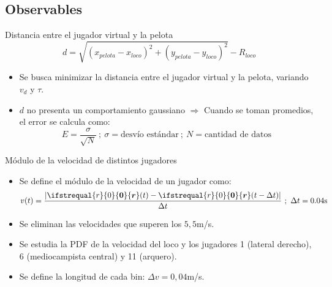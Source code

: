 \documentclass{beamer}
\renewcommand\vec[1]{\ifstrequal{#1}{0}{\ensuremath{\mathbf{0}}}{\ensuremath{\boldsymbol{#1}}}}
\begin{document}
        \subsection{Observables}

            \begin{frame}{Distancia entre el jugador virtual y la pelota}
                \begin{equation*}
                    d = \sqrt{(x_{pelota} - x_{loco})^2 + (y_{pelota} - y_{loco})^2} - R_{loco}
                \end{equation*}
                \begin{itemize}
                    \item Se busca minimizar la distancia entre el jugador virtual y la pelota, variando $v_d$ y $\tau$.
                    \item $d$ no presenta un comportamiento gaussiano $\Rightarrow$ Cuando se toman promedios, el error se calcula como:
                    \begin{equation*}
                        E = \frac{\sigma}{\sqrt{N}}\ ;\ \sigma = \text{desvío estándar}\ ;\ N = \text{cantidad de datos}
                    \end{equation*}
                \end{itemize}
            \end{frame}

            \begin{frame}{Módulo de la velocidad de distintos jugadores}
                \begin{itemize}
                    \item Se define el módulo de la velocidad de un jugador como:
                    \begin{equation*}
                        v(t) = \frac{|\vec{r}(t) - \vec{r}(t - \Delta t)|}{\Delta t}\ ;\ \Delta t = 0.04 \text{s}
                    \end{equation*}
                    \item Se eliminan las velocidades que superen los $5,5$m/s.
                    \item Se estudia la PDF de la velocidad del loco y los jugadores 1 (lateral derecho), 6 (mediocampista central) y 11 (arquero).
                    \item Se define la longitud de cada bin: $\Delta v = 0,04$m/s.
                \end{itemize}
            \end{frame}
\end{document}
